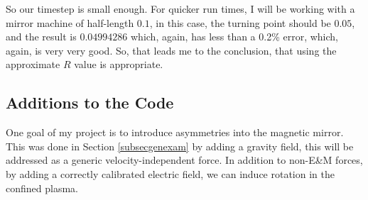 \documentclass[12pt]{article}
\begin{document}
So our timestep is small enough. For quicker run times, I will be working with a mirror machine of half-length $0.1$, in this case, the turning point should be $0.05$, and the result is $0.04994286$ which, again, has less than a 0.2\% error, which, again, is very very good. So, that leads me to the conclusion, that using the approximate $R$ value is appropriate.

\subsection{Additions to the Code}
One goal of my project is to introduce asymmetries into the magnetic mirror. This was done in Section \ref{subsecgenexam} by adding a gravity field, this will be addressed as a generic velocity-independent force. In addition to non-E\&M forces, by adding a correctly calibrated electric field, we can induce rotation in the confined plasma.  
\end{document}
